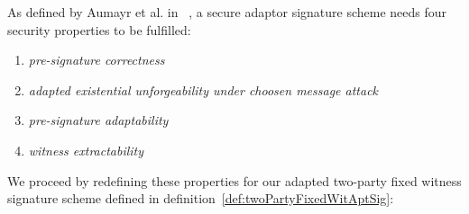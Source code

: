 \begin{definition}
    As defined by Aumayr et al. in ~\cite{aumayr2020bitcoinchannels}, a secure adaptor signature scheme needs four security properties to be fulfilled:
    \begin{enumerate}
        \item \textit{pre-signature correctness}
        \item \textit{adapted existential unforgeability under choosen message attack}
        \item \textit{pre-signature adaptability}
        \item \textit{witness extractability}
    \end{enumerate}
\end{definition}

We proceed by redefining these properties for our adapted two-party fixed witness signature scheme defined in definition~\ref{def:twoPartyFixedWitAptSig}:

